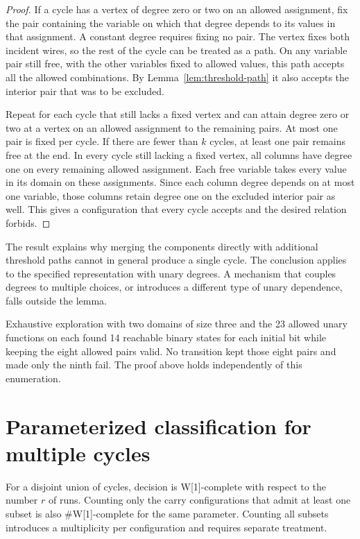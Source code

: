 \documentclass[11pt,a4paper]{article}
\numberwithin{equation}{section}
\begin{document}
\begin{proof}
If a cycle has a vertex of degree zero or two on an allowed assignment, fix the pair containing the variable on which that degree depends to its values in that assignment. A constant degree requires fixing no pair. The vertex fixes both incident wires, so the rest of the cycle can be treated as a path. On any variable pair still free, with the other variables fixed to allowed values, this path accepts all the allowed combinations. By Lemma~\ref{lem:threshold-path} it also accepts the interior pair that was to be excluded.

Repeat for each cycle that still lacks a fixed vertex and can attain degree zero or two at a vertex on an allowed assignment to the remaining pairs. At most one pair is fixed per cycle. If there are fewer than \(k\) cycles, at least one pair remains free at the end. In every cycle still lacking a fixed vertex, all columns have degree one on every remaining allowed assignment. Each free variable takes every value in its domain on these assignments. Since each column degree depends on at most one variable, those columns retain degree one on the excluded interior pair as well. This gives a configuration that every cycle accepts and the desired relation forbids.
\end{proof}

The result explains why merging the components directly with additional threshold paths cannot in general produce a single cycle. The conclusion applies to the specified representation with unary degrees. A mechanism that couples degrees to multiple choices, or introduces a different type of unary dependence, falls outside the lemma.

Exhaustive exploration with two domains of size three and the 23 allowed unary functions on each found 14 reachable binary states for each initial bit while keeping the eight allowed pairs valid. No transition kept those eight pairs and made only the ninth fail. The proof above holds independently of this enumeration.

\section{Parameterized classification for multiple cycles}\label{parameterized-classification-for-multiple-cycles}

For a disjoint union of cycles, decision is W{[}1{]}-complete with respect to the number \(r\) of runs. Counting only the carry configurations that admit at least one subset is also \#W{[}1{]}-complete for the same parameter. Counting all subsets introduces a multiplicity per configuration and requires separate treatment.
\end{document}
